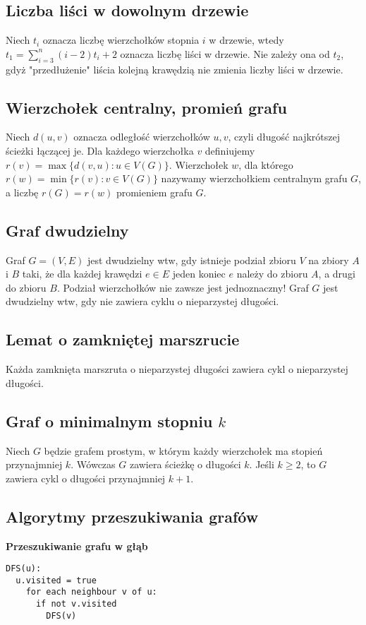 \subsection*{Liczba liści w dowolnym drzewie}
Niech $t_i$ oznacza liczbę wierzchołków stopnia $i$ w drzewie, wtedy \\
$t_1 = \sum\limits_{i=3}^{n} (i-2)t_i + 2$
oznacza liczbę liści w drzewie. Nie zależy ona od $t_2$, gdyż "przedłużenie"
liścia kolejną krawędzią nie zmienia liczby liści w drzewie.

\subsection*{Wierzchołek centralny, promień grafu}
Niech $d(u,v)$ oznacza odległość wierzchołków $u, v$, czyli długość najkrótszej
ścieżki łączącej je. Dla każdego wierzchołka $v$ definiujemy \\
$r(v) = \max \{ d(v, u) : u \in V(G) \}$. Wierzchołek $w$, dla którego 
$r(w) = \min \{ r(v) : v \in V(G) \}$ nazywamy wierzchołkiem centralnym grafu
$G$, a liczbę $r(G) = r(w)$ promieniem grafu $G$.

\subsection*{Graf dwudzielny}
Graf $G = (V, E)$ jest dwudzielny wtw, gdy istnieje podział zbioru $V$ na 
zbiory $A$ i $B$ taki, że dla każdej krawędzi $e \in E$ jeden koniec $e$
należy do zbioru $A$, a drugi do zbioru $B$. Podział wierzchołków nie zawsze
jest jednoznaczny! Graf $G$ jest dwudzielny wtw, gdy nie zawiera cyklu 
o nieparzystej długości.

\subsection*{Lemat o zamkniętej marszrucie}
Każda zamknięta marszruta o nieparzystej długości zawiera cykl o nieparzystej
długości.

\subsection*{Graf o minimalnym stopniu $k$}
Niech $G$ będzie grafem prostym, w którym każdy wierzchołek ma stopień 
przynajmniej $k$. Wówczas $G$ zawiera ścieżkę o długości $k$. Jeśli $k \geq 2$,
to $G$ zawiera cykl o długości przynajmniej $k+1$.

\subsection*{Algorytmy przeszukiwania grafów}
\textbf{Przeszukiwanie grafu w głąb}
\begin{lstlisting}[style=code]
DFS(u):
  u.visited = true
    for each neighbour v of u:
      if not v.visited
        DFS(v)
\end{lstlisting}

